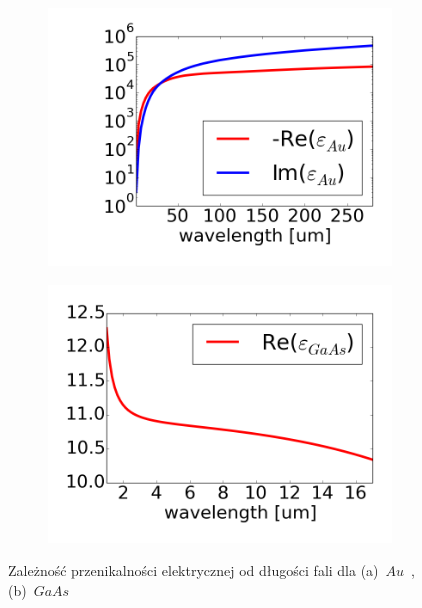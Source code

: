 \begin{figure}[tb]
	\begin{subfigure}{.45\textwidth}
		\includegraphics[width=\textwidth]{images/aueps.png}
		\caption{}
		\label{fig:aueps}
	\end{subfigure}
	\begin{subfigure}{.45\textwidth}
		\includegraphics[width=\textwidth]{images/gaaseps.png}
		\caption{}
		\label{fig:gaaseps}
	\end{subfigure}
	\caption{Zależność przenikalności elektrycznej od długości fali dla (a)~$Au$~\cite{Hagemann:75}, (b)~$GaAs$~\cite{skauli2003improved}}
\end{figure}


